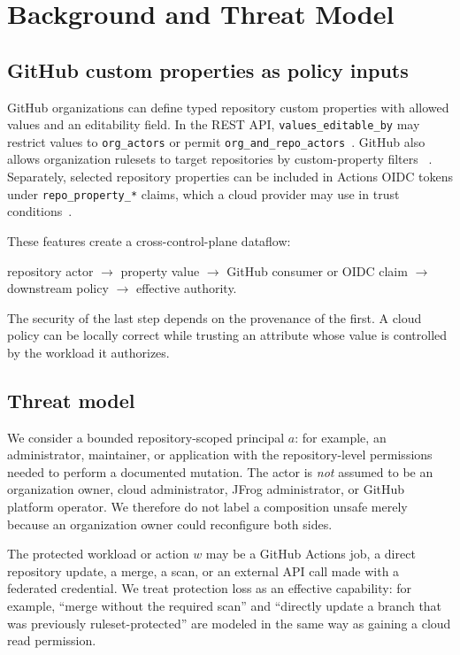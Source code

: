 \documentclass[sigconf,review,anonymous]{acmart}
\begin{document}
\section{Background and Threat Model}

\subsection{GitHub custom properties as policy inputs}

GitHub organizations can define typed repository custom properties with allowed
values and an editability field.  In the REST API, \nolinkurl{values_editable_by}
may restrict values to \texttt{org\_actors} or permit
\texttt{org\_and\_repo\_actors}~\cite{github-custom-properties-api}.  GitHub also
allows organization rulesets to target repositories by custom-property filters
~\cite{github-rulesets}.  Separately, selected repository properties can be
included in Actions OIDC tokens under \texttt{repo\_property\_*} claims, which a
cloud provider may use in trust conditions~\cite{github-oidc-properties}.

These features create a cross-control-plane dataflow:

\begin{center}
\small
repository actor $\rightarrow$ property value $\rightarrow$ GitHub consumer or
OIDC claim $\rightarrow$ downstream policy $\rightarrow$ effective authority.
\end{center}

The security of the last step depends on the provenance of the first.  A cloud
policy can be locally correct while trusting an attribute whose value is
controlled by the workload it authorizes.

\subsection{Threat model}

We consider a bounded repository-scoped principal $a$: for example, an
administrator, maintainer, or application with the repository-level permissions
needed to perform a documented mutation.  The actor is \emph{not} assumed to be
an organization owner, cloud administrator, JFrog administrator, or GitHub
platform operator.  We therefore do not label a composition unsafe merely
because an organization owner could reconfigure both sides.

The protected workload or action $w$ may be a GitHub Actions job, a direct
repository update, a merge, a scan, or an external API call made with a
federated credential.  We treat protection loss as an effective capability: for
example, ``merge without the required scan'' and ``directly update a branch that
was previously ruleset-protected'' are modeled in the same way as gaining a
cloud read permission.
\end{document}
